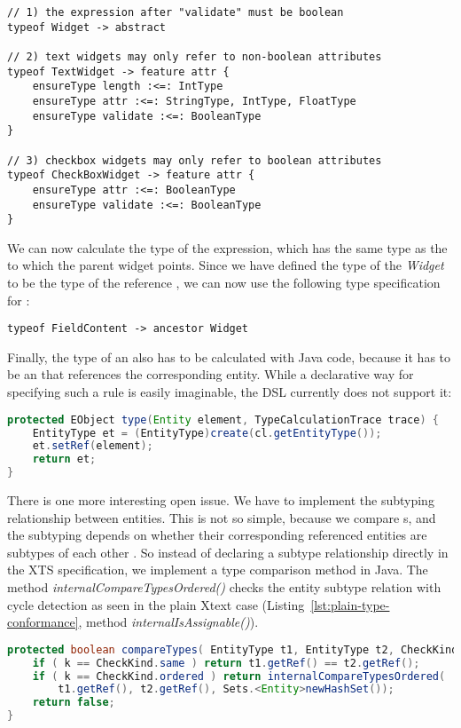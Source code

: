 \begin{lstlisting}[language=xts,float,label=lst:xts-widgets] 
// 1) the expression after "validate" must be boolean
typeof Widget -> abstract

// 2) text widgets may only refer to non-boolean attributes 
typeof TextWidget -> feature attr {
    ensureType length :<=: IntType
    ensureType attr :<=: StringType, IntType, FloatType
    ensureType validate :<=: BooleanType
}  

// 3) checkbox widgets may only refer to boolean attributes
typeof CheckBoxWidget -> feature attr {
    ensureType attr :<=: BooleanType
    ensureType validate :<=: BooleanType
}
\end{lstlisting}


We can now calculate the type of the  expression, which has the
same type as the  to which the parent widget points. Since we have
defined the type of the \emph{Widget} to be the type of the reference , we can
now use the following type specification for :

\begin{lstlisting}[language=xts]
typeof FieldContent -> ancestor Widget
\end{lstlisting}

Finally, the type of an  also has to be calculated with Java code, because
it has to be an  that references the corresponding entity. While
a declarative way for specifying such a rule is easily imaginable, the DSL
currently does not support it:

\begin{lstlisting}[language=Java]
protected EObject type(Entity element, TypeCalculationTrace trace) {
    EntityType et = (EntityType)create(cl.getEntityType());
    et.setRef(element);
    return et;
}
\end{lstlisting}

There is one more interesting open issue. We have to implement the subtyping
relationship between entities. This is not so simple, because we compare
s, and the subtyping depends on whether their corresponding
referenced entities are subtypes of each other . So instead of declaring a subtype relationship directly
in the XTS specification, we implement a type comparison method in Java. The
method \emph{internalCompareTypesOrdered()} checks the entity subtype relation
with cycle detection as seen in the plain Xtext case
(Listing~\ref{lst:plain-type-conformance}, method
\emph{internalIsAssignable()}).


\begin{lstlisting}[language=Java]
protected boolean compareTypes( EntityType t1, EntityType t2, CheckKind k, TypeCalculationTrace trace ) {
    if ( k == CheckKind.same ) return t1.getRef() == t2.getRef();
    if ( k == CheckKind.ordered ) return internalCompareTypesOrdered(
        t1.getRef(), t2.getRef(), Sets.<Entity>newHashSet());
    return false; 
}
\end{lstlisting}


  
